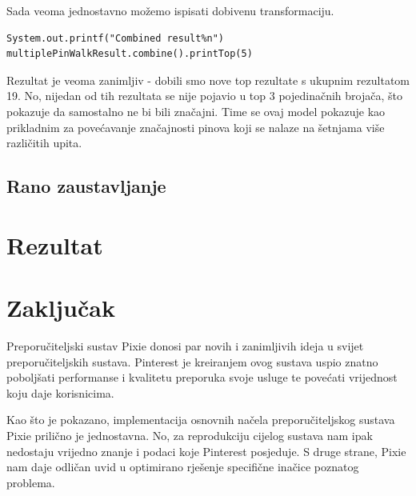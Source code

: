 \documentclass[times, utf8, seminar]{fer}
\begin{document}
Sada veoma jednostavno možemo ispisati dobivenu transformaciju.

\begin{lstlisting}
System.out.printf("Combined result%n")
multiplePinWalkResult.combine().printTop(5)
\end{lstlisting}

Rezultat je veoma zanimljiv - dobili smo nove top rezultate s ukupnim rezultatom 19. No, nijedan od tih rezultata se nije pojavio u top 3 pojedinačnih brojača, što pokazuje da samostalno ne bi bili značajni. Time se ovaj model pokazuje kao prikladnim za povećavanje značajnosti pinova koji se nalaze na šetnjama više različitih upita.

\section{Rano zaustavljanje}

\chapter{Rezultat}

\chapter{Zaključak}

Preporučiteljski sustav Pixie donosi par novih i zanimljivih ideja u svijet preporučiteljskih sustava. Pinterest je kreiranjem ovog sustava uspio znatno poboljšati performanse i kvalitetu preporuka svoje usluge te povećati vrijednost koju daje korisnicima.

Kao što je pokazano, implementacija osnovnih načela preporučiteljskog sustava Pixie prilično je jednostavna. No, za reprodukciju cijelog sustava nam ipak nedostaju vrijedno znanje i podaci koje Pinterest posjeduje. S druge strane, Pixie nam daje odličan uvid u optimirano rješenje specifične inačice poznatog problema.



\end{document}
